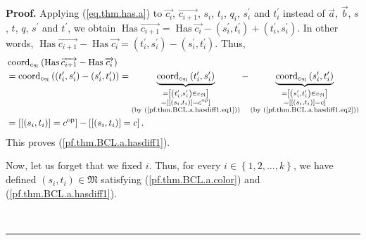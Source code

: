 \documentclass[numbers=enddot,12pt,final,onecolumn,notitlepage,abstracton]{scrartcl}%
\theoremstyle{definition}
\newenvironment{proof}[1][Proof]{\noindent\textbf{#1.} }{\ \rule{0.5em}{0.5em}}
\begin{document}
\begin{proof}
Applying (\ref{eq.thm.has.a}) to $\overrightarrow{c_{i}}$,
$\overrightarrow{c_{i+1}}$, $s_{i}$, $t_{i}$, $q_{i}$, $s_{i}^{\prime}$ and
$t_{i}^{\prime}$ instead of $\overrightarrow{a}$, $\overrightarrow{b}$, $s$,
$t$, $q$, $s^{\prime}$ and $t^{\prime}$, we obtain $\operatorname*{Has}%
\overrightarrow{c_{i+1}}=\operatorname*{Has}\overrightarrow{c_{i}}-\left(
s_{i}^{\prime},t_{i}^{\prime}\right)  +\left(  t_{i}^{\prime},s_{i}^{\prime
}\right)  $. In other words, $\operatorname*{Has}\overrightarrow{c_{i+1}%
}-\operatorname*{Has}\overrightarrow{c_{i}}=\left(  t_{i}^{\prime}%
,s_{i}^{\prime}\right)  -\left(  s_{i}^{\prime},t_{i}^{\prime}\right)  $.
Thus,%
\begin{align*}
&  \operatorname*{coord}\nolimits_{c_{\mathfrak{N}}}\left(
\operatorname*{Has}\overrightarrow{c_{i+1}}-\operatorname*{Has}%
\overrightarrow{c_{i}}\right) \\
&  =\operatorname*{coord}\nolimits_{c_{\mathfrak{N}}}\left(  \left(
t_{i}^{\prime},s_{i}^{\prime}\right)  -\left(  s_{i}^{\prime},t_{i}^{\prime
}\right)  \right)  =\underbrace{\operatorname*{coord}%
\nolimits_{c_{\mathfrak{N}}}\left(  t_{i}^{\prime},s_{i}^{\prime}\right)
}_{\substack{=\left[  \left(  t_{i}^{\prime},s_{i}^{\prime}\right)  \in
c_{\mathfrak{N}}\right]  \\=\left[  \left[  \left(  s_{i},t_{i}\right)
\right]  =c^{\operatorname*{op}}\right]  \\\text{(by
(\ref{pf.thm.BCL.a.hasdiff1.eq1}))}}}-\underbrace{\operatorname*{coord}%
\nolimits_{c_{\mathfrak{N}}}\left(  s_{i}^{\prime},t_{i}^{\prime}\right)
}_{\substack{=\left[  \left(  s_{i}^{\prime},t_{i}^{\prime}\right)  \in
c_{\mathfrak{N}}\right]  \\=\left[  \left[  \left(  s_{i},t_{i}\right)
\right]  =c\right]  \\\text{(by (\ref{pf.thm.BCL.a.hasdiff1.eq2}))}}}\\
&  =\left[  \left[  \left(  s_{i},t_{i}\right)  \right]
=c^{\operatorname*{op}}\right]  -\left[  \left[  \left(  s_{i},t_{i}\right)
\right]  =c\right]  .
\end{align*}
This proves (\ref{pf.thm.BCL.a.hasdiff1}).

Now, let us forget that we fixed $i$. Thus, for every $i\in\left\{
1,2,\ldots,k\right\}  $, we have defined $\left(  s_{i},t_{i}\right)
\in\mathfrak{M}$ satisfying (\ref{pf.thm.BCL.a.color}) and
(\ref{pf.thm.BCL.a.hasdiff1}).


\end{proof}
\end{document}
